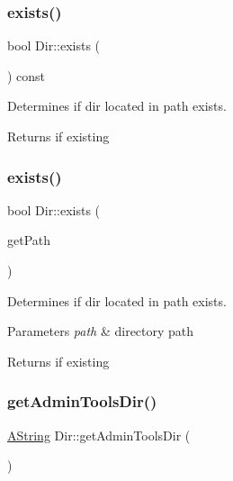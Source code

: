 \subsubsection{\texorpdfstring{exists()}{exists()}\hspace{0.1cm}{\footnotesize\ttfamily [1/2]}}
{\footnotesize\ttfamily bool Dir\+::exists (\begin{DoxyParamCaption}{ }\end{DoxyParamCaption}) const}



Determines if dir located in path exists. 

\begin{DoxyReturn}{Returns}
if existing 
\end{DoxyReturn}
\mbox{\label{class_dir_a199893b7d2c0981704e2455d5c02cc92}} 
\subsubsection{\texorpdfstring{exists()}{exists()}\hspace{0.1cm}{\footnotesize\ttfamily [2/2]}}
{\footnotesize\ttfamily bool Dir\+::exists (\begin{DoxyParamCaption}\item[{const \mbox{\hyperlink{class_a_string}{A\+String}} \&}]{get\+Path }\end{DoxyParamCaption})\hspace{0.3cm}{\ttfamily [static]}}



Determines if dir located in path exists. 


\begin{DoxyParams}{Parameters}
{\em path} & directory path \\
\hline
\end{DoxyParams}
\begin{DoxyReturn}{Returns}
if existing 
\end{DoxyReturn}
\mbox{\label{class_dir_af6942740610aa474213806c78a206467}} 
\subsubsection{\texorpdfstring{getAdminToolsDir()}{getAdminToolsDir()}}
{\footnotesize\ttfamily \mbox{\hyperlink{class_a_string}{A\+String}} Dir\+::get\+Admin\+Tools\+Dir (\begin{DoxyParamCaption}{ }\end{DoxyParamCaption})\hspace{0.3cm}{\ttfamily [static]}}



